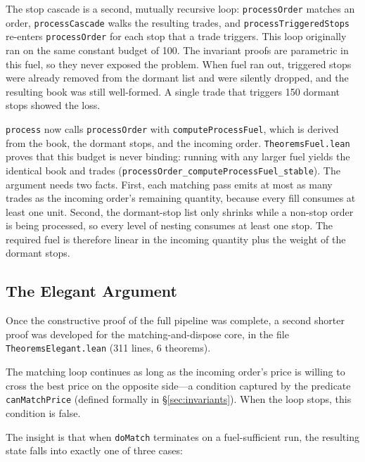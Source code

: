 \documentclass[11pt,a4paper]{article}
\begin{document}
The stop cascade is a second, mutually recursive loop:
\texttt{processOrder} matches an order, \texttt{processCascade} walks
the resulting trades, and \texttt{processTriggeredStops} re-enters
\texttt{processOrder} for each stop that a trade triggers. This loop
originally ran on the same constant budget of 100. The invariant proofs
are parametric in this fuel, so they never exposed the problem. When
fuel ran out, triggered stops were already removed from the dormant
list and were silently dropped, and the resulting book was still
well-formed. A single trade that triggers 150 dormant stops showed the
loss.

\texttt{process} now calls \texttt{processOrder} with
\texttt{computeProcessFuel}, which is derived from the book, the
dormant stops, and the incoming order. \texttt{TheoremsFuel.lean} proves
that this budget is never binding: running with any larger fuel yields
the identical book and trades
(\texttt{processOrder\_computeProcessFuel\_stable}). The argument
needs two facts. First, each matching pass emits at most as many
trades as the incoming order's remaining quantity, because every fill
consumes at least one unit. Second, the dormant-stop list only shrinks
while a non-stop order is being processed, so every level of nesting
consumes at least one stop. The required fuel is therefore linear in
the incoming quantity plus the weight of the dormant stops.

\subsection{The Elegant Argument}
\label{sec:lean-elegant}

Once the constructive proof of the full pipeline was complete, a second
shorter proof was developed for the matching-and-dispose core, in the
file \texttt{TheoremsElegant.lean} (311 lines, 6 theorems).

The matching loop continues as long as the incoming order's price is
willing to cross the best price on the opposite side---a condition
captured by the predicate \texttt{canMatchPrice} (defined formally in
\S\ref{sec:invariants}). When the loop stops, this condition is false.

The insight is that when \texttt{doMatch} terminates on a
fuel-sufficient run, the resulting state falls into exactly one of
three cases:
\end{document}
